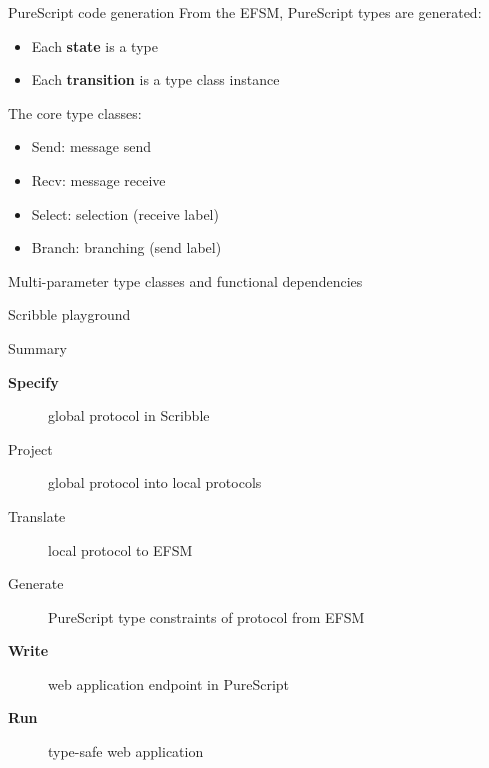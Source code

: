\documentclass[aspectratio=1610]{beamer}
\begin{document}
\begin{frame}{PureScript code generation}
  From the EFSM, PureScript types are generated:
  \begin{itemize}
    \item Each \textbf{state} is a type
    \item Each \textbf{transition} is a type class instance
  \end{itemize}

  The core type classes:
  \begin{itemize}
    \item Send: message send
    \item Recv: message receive
    \item Select: selection (receive label)
    \item Branch: branching (send label)
  \end{itemize}
\end{frame}

\begin{frame}{Multi-parameter type classes and functional dependencies}
\end{frame}

\begin{frame}{Scribble playground}
\end{frame}

\begin{frame}{Summary}
  \begin{description}
    \item [\bf Specify] \textcolor{gprot}{global protocol} in Scribble
    \item [Project] \textcolor{gprot}{global protocol} into \textcolor{lprot}{local protocols}
    \item [Translate] \textcolor{lprot}{local protocol} to \textcolor{efsm}{EFSM}
    \item [Generate] PureScript type constraints of protocol from \textcolor{efsm}{EFSM}
    \item [\bf Write] \textcolor{proc}{web application} endpoint in PureScript
    \item [\bf Run] type-safe web application
  \end{description}
\end{frame}
\end{document}
